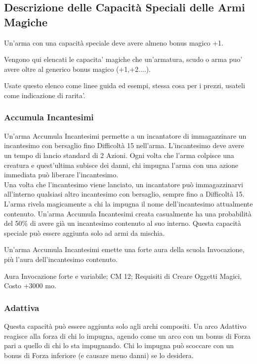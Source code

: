 \subsection{Descrizione delle Capacità Speciali delle Armi Magiche}

Un'arma con una capacità speciale deve avere almeno bonus magico +1.

Vengono qui elencati le capacita' magiche che un'armatura, scudo o arma puo' avere oltre al generico bonus magico (+1,+2....).

Usate questo elenco come linee guida ed esempi, stessa cosa per i prezzi, usateli come indicazione di rarita'.

\begin{multicols}{2}

\subsubsection{Accumula Incantesimi}

Un'arma Accumula Incantesimi permette a un incantatore di immagazzinare un incantesimo con bersaglio fino Difficoltà 15 nell'arma. L'incantesimo deve avere un tempo di lancio standard di 2 Azioni. Ogni volta che l'arma colpisce una creatura e quest'ultima subisce dei danni, chi impugna l'arma con una azione immediata può liberare l'incantesimo.\\
Una volta che l'incantesimo viene lanciato, un incantatore può immagazzinarvi all'interno qualsiasi altro incantesimo con bersaglio, sempre fino a Difficoltà 15.\\
L'arma rivela magicamente a chi la impugna il nome dell'incantesimo attualmente contenuto. Un'arma Accumula Incantesimi creata casualmente ha una probabilità del 50\% di avere già un incantesimo contenuto al suo interno. Questa capacità speciale può essere aggiunta solo ad armi da mischia.

Un'arma Accumula Incantesimi emette una forte aura della scuola Invocazione, più l'aura dell'incantesimo contenuto.

Aura Invocazione forte e variabile; CM 12; Requisiti di Creare Oggetti Magici, Costo +3000 mo.

\subsubsection{Adattiva}

Questa capacità può essere aggiunta solo agli archi compositi. Un arco Adattivo reagisce alla forza di chi lo impugna, agendo come un arco con un bonus di Forza pari a quello di chi lo sta impugnando. Chi lo impugna può scoccare con un bonus di Forza inferiore (e causare meno danni) se lo desidera.


\end{multicols}
